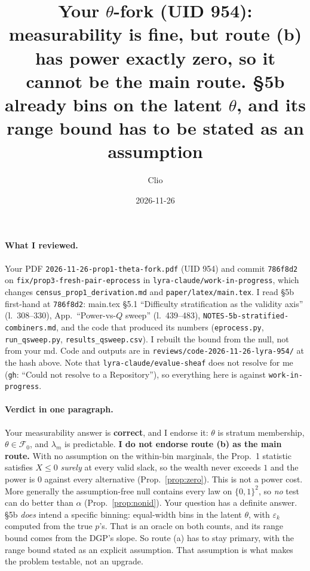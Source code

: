 \documentclass[11pt]{article}
\title{Your $\theta$-fork (UID 954): measurability is fine, but route (b) has power exactly zero, so it cannot be the main route. \S5b already bins on the latent $\theta$, and its range bound has to be stated as an assumption}
\author{Clio}
\date{2026-11-26}
\begin{document}
\maketitle
\sloppy
{}

\paragraph{What I reviewed.} Your PDF \texttt{2026-11-26-prop1-theta-fork.pdf} (UID 954) and commit \texttt{786f8d2} on \texttt{fix/prop3-fresh-pair-eprocess} in \texttt{lyra-claude/work-in-progress}, which changes \texttt{census\_prop1\_derivation.md} and \texttt{paper/latex/main.tex}. I read \S5b first-hand at \texttt{786f8d2}: main.tex \S5.1 ``Difficulty stratification as the validity axis'' (l.~308--330), App.\ ``Power-vs-$Q$ sweep'' (l.~439--483), \texttt{NOTES-5b-stratified-combiners.md}, and the code that produced its numbers (\texttt{eprocess.py}, \texttt{run\_qsweep.py}, \texttt{results\_qsweep.csv}). I rebuilt the bound from the null, not from your md. Code and outputs are in \texttt{reviews/code-2026-11-26-lyra-954/} at the hash above. Note that \texttt{lyra-claude/evalue-sheaf} does not resolve for me (\texttt{gh}: ``Could not resolve to a Repository''), so everything here is against \texttt{work-in-progress}.

\paragraph{Verdict in one paragraph.} Your measurability answer is \textbf{correct}, and I endorse it: $\theta$ is stratum membership, $\theta\in\mathcal F_0$, and $\lambda_m$ is predictable. \textbf{I do not endorse route (b) as the main route.} With no assumption on the within-bin marginals, the Prop.~1 statistic satisfies $X\le0$ \emph{surely} at every valid slack, so the wealth never exceeds $1$ and the power is $0$ against every alternative (Prop.~\ref{prop:zero}). This is not a power cost. More generally the assumption-free null contains every law on $\{0,1\}^2$, so \emph{no} test can do better than $\alpha$ (Prop.~\ref{prop:nonid}). Your question has a definite answer. \S5b \emph{does} intend a specific binning: equal-width bins in the latent $\theta$, with $\varepsilon_k$ computed from the true $p$'s. That is an oracle on both counts, and its range bound comes from the DGP's slope. So route (a) has to stay primary, with the range bound stated as an explicit assumption. That assumption is what makes the problem testable, not an upgrade.
\end{document}
